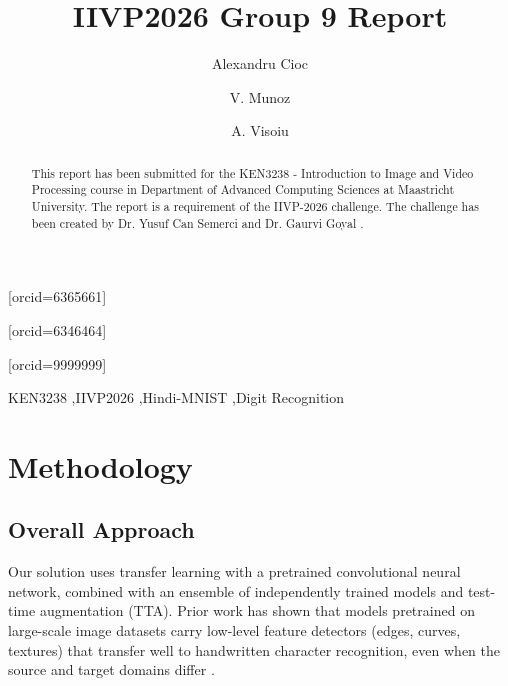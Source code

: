 \documentclass[a4paper,fleqn]{cas-sc}
\begin{document}
\graphicspath{{./}}


\title [mode = title]{IIVP2026 Group 9 Report}

\author[1]{Alexandru Cioc}[orcid=6365661]
\author[1]{V. Munoz}[orcid=6346464]
\author[1]{A. Visoiu}[orcid=9999999]


\begin{abstract}
This report has been submitted for the KEN3238 - Introduction to Image and Video Processing course in Department of Advanced Computing Sciences at Maastricht University. The report is a requirement of the IIVP-2026 challenge. The challenge has been created by Dr. Yusuf Can Semerci and Dr. Gaurvi Goyal \citep{the_challenge}.
\end{abstract}

\begin{keywords}
KEN3238 \sep IIVP2026 \sep Hindi-MNIST \sep Digit Recognition
\end{keywords}
\maketitle
\clearpage

\section{Methodology}

\subsection{Overall Approach}

Our solution uses transfer learning with a pretrained convolutional neural network, combined with an ensemble of independently trained models and test-time augmentation (TTA). Prior work has shown that models pretrained on large-scale image datasets carry low-level feature detectors (edges, curves, textures) that transfer well to handwritten character recognition, even when the source and target domains differ \citep{deng2009imagenet}.
\end{document}
